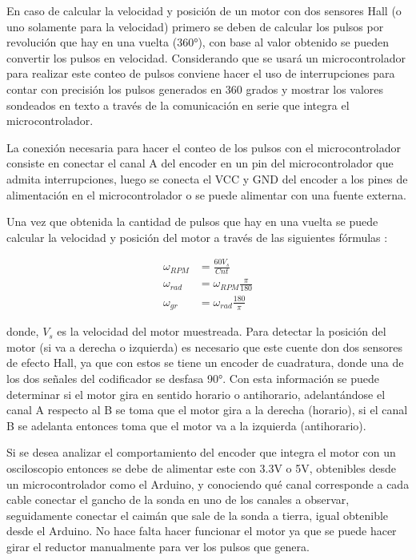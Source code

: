 \documentclass[12pt,letterpaper,notitlepage]{report}
\newlength{\spacing} \setlength{\spacing}{\baselineskip}
\newcommand{\nspace}[1]{\setlength{\baselineskip}{#1\spacing}}
\newenvironment{linespacing}[1]{\nspace{#1}}{}
\begin{document}
{\begin{linespacing}{1.5}
En caso de calcular la velocidad y posición de un motor con dos sensores Hall (o uno solamente para la velocidad) primero se deben de calcular los pulsos por revolución que hay en una vuelta (360°), con base al valor obtenido se pueden convertir los pulsos en velocidad. Considerando que se usará un microcontrolador para realizar este conteo de pulsos conviene hacer el uso de interrupciones para contar con precisión los pulsos generados en 360 grados y mostrar los valores sondeados en texto a través de la comunicación en serie que integra el microcontrolador. 

La conexión necesaria para hacer el conteo de los pulsos con el microcontrolador consiste en conectar el canal A del encoder en un pin del microcontrolador que admita interrupciones, luego se conecta el VCC y GND del encoder a los pines de alimentación en el microcontrolador o se puede alimentar con una fuente externa.

Una vez que obtenida la cantidad de pulsos que hay en una vuelta se puede calcular la velocidad y posición del motor a través de las siguientes fórmulas \cite{automaticaddison-2021}:

\begin{equation}
\begin{aligned}
	\omega_{RPM} &= \frac{60V_s}{Cnt}\\
	\omega_{rad} &= \omega_{RPM}\frac{\pi}{180}\\
	\omega_{gr} &= \omega_{rad}\frac{180}{\pi}
\end{aligned}
\end{equation}

donde, $V_s$ es la velocidad del motor muestreada.
Para detectar la posición del motor (si va a derecha o izquierda) es necesario que este cuente don dos sensores de efecto Hall, ya que con estos se tiene un encoder de cuadratura, donde una de los dos señales del codificador se desfasa 90°. Con esta información se puede determinar si el motor gira en sentido horario o antihorario, adelantándose el canal A respecto al B se toma que el motor gira a la derecha (horario), si el canal B se adelanta entonces toma que el motor va a la izquierda (antihorario).

Si se desea analizar el comportamiento del encoder que integra el motor con un osciloscopio entonces se debe de alimentar este con 3.3V o 5V, obtenibles desde un microcontrolador como el Arduino, y conociendo qué canal corresponde a cada cable conectar el gancho de la sonda en uno de los canales a observar, seguidamente conectar el caimán que sale de la sonda a tierra, igual obtenible desde el Arduino. No hace falta hacer funcionar el motor ya que se puede hacer girar el reductor manualmente para ver los pulsos que genera.


\end{linespacing}}
\end{document}
